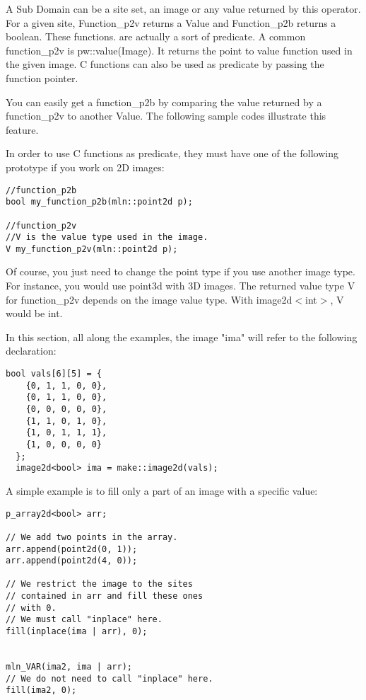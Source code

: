 \documentclass{report}
\begin{document}
A Sub Domain can be a site set, an image or any value returned by this
operator.
For a given site, Function\_p2v returns a Value and Function\_p2b returns a
boolean. These functions. are actually a sort of predicate. A common
function\_p2v is pw::value(Image). It returns the
point to value function used in the given image. C functions can also be used as
predicate by passing the function pointer.

You can easily get a function\_p2b by comparing the value returned 
by a function\_p2v to another Value.
The following sample codes illustrate this feature.

In order to use C functions as predicate, they must have one of the following
prototype if you work on 2D images:
\begin{lstlisting}[frame=single]
//function_p2b
bool my_function_p2b(mln::point2d p);

//function_p2v
//V is the value type used in the image.
V my_function_p2v(mln::point2d p);
\end{lstlisting}
Of course, you just need to change the point type if you use another image
type. For instance, you would use point3d with 3D images.
The returned value type V for function\_p2v depends on the image value type.
With image2d$<$int$>$, V would be int.

In this section, all along the examples, the image "ima" will refer to the
following declaration:
\begin{lstlisting}[frame=single]
  bool vals[6][5] = {
    {0, 1, 1, 0, 0},
    {0, 1, 1, 0, 0},
    {0, 0, 0, 0, 0},
    {1, 1, 0, 1, 0},
    {1, 0, 1, 1, 1},
    {1, 0, 0, 0, 0}
  };
  image2d<bool> ima = make::image2d(vals);
\end{lstlisting}

A simple example is to fill only a part of an image with a specific value:
\begin{lstlisting}[frame=single]
p_array2d<bool> arr;

// We add two points in the array.
arr.append(point2d(0, 1));
arr.append(point2d(4, 0));

// We restrict the image to the sites
// contained in arr and fill these ones
// with 0.
// We must call "inplace" here.
fill(inplace(ima | arr), 0);


mln_VAR(ima2, ima | arr);
// We do not need to call "inplace" here.
fill(ima2, 0);
\end{lstlisting}
\end{document}
